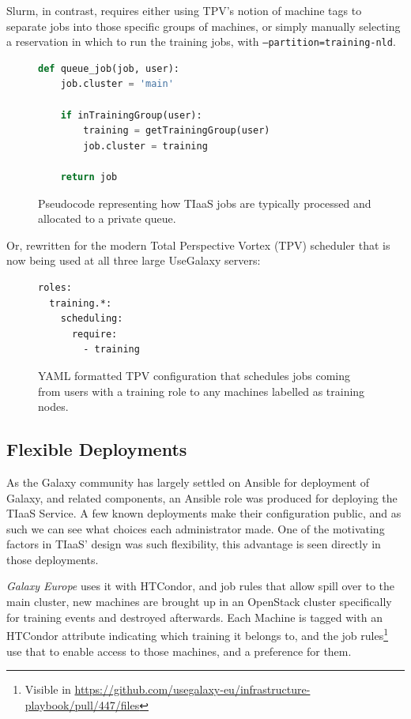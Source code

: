 \documentclass[a4paper,num-refs]{oup-contemporary}
\begin{document}
Slurm, in contrast, requires either using TPV's notion of machine tags to separate jobs into those specific groups of machines, or simply manually selecting a reservation in which to run the training jobs, with \texttt{--partition=training-nld}.

\begin{figure}[!ht]
\centering
\begin{lstlisting}[frame=single,language=Python]
def queue_job(job, user):
    job.cluster = 'main'

    if inTrainingGroup(user):
        training = getTrainingGroup(user)
        job.cluster = training

    return job
\end{lstlisting}
\caption{Pseudocode representing how TIaaS jobs are typically processed and allocated to a private queue.\label{code:scheduler}}
\end{figure}

Or, rewritten for the modern Total Perspective Vortex (TPV)\cite{TPV} scheduler that is now being used at all three large UseGalaxy servers:

\begin{figure}[!ht]
\centering
\begin{lstlisting}[frame=single,language=bash]
roles:
  training.*:
    scheduling:
      require:
        - training
\end{lstlisting}
\caption{YAML formatted TPV configuration that schedules jobs coming from users with a training role to any machines labelled as training nodes.\label{code:tpv}}
\end{figure}

\subsection{Flexible Deployments}
As the Galaxy community has largely settled on Ansible for deployment of Galaxy, and related components, an Ansible role was produced for deploying the TIaaS Service. A few known deployments make their configuration public, and as such we can see what choices each administrator made. One of the motivating factors in TIaaS' design was such flexibility, this advantage is seen directly in those deployments.

\emph{Galaxy Europe} uses it with HTCondor, and job rules that allow spill over to the main cluster, new machines are brought up in an OpenStack cluster specifically for training events and destroyed afterwards. Each Machine is tagged with an HTCondor attribute indicating which training it belongs to, and the job rules\footnote{Visible in \url{https://github.com/usegalaxy-eu/infrastructure-playbook/pull/447/files}} use that to enable access to those machines, and a preference for them.
\end{document}
